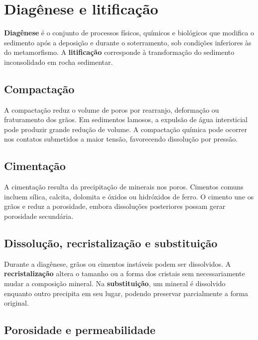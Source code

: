 \section{Diagênese e litificação}

\begin{definicao}
\textbf{Diagênese} é o conjunto de processos físicos, químicos e biológicos que modifica o sedimento após a deposição e durante o soterramento, sob condições inferiores às do metamorfismo. A \textbf{litificação} corresponde à transformação do sedimento inconsolidado em rocha sedimentar.
\end{definicao}

\subsection{Compactação}

A compactação reduz o volume de poros por rearranjo, deformação ou fraturamento dos grãos. Em sedimentos lamosos, a expulsão de água intersticial pode produzir grande redução de volume. A compactação química pode ocorrer nos contatos submetidos a maior tensão, favorecendo dissolução por pressão.

\subsection{Cimentação}

A cimentação resulta da precipitação de minerais nos poros. Cimentos comuns incluem sílica, calcita, dolomita e óxidos ou hidróxidos de ferro. O cimento une os grãos e reduz a porosidade, embora dissoluções posteriores possam gerar porosidade secundária.

\subsection{Dissolução, recristalização e substituição}

Durante a diagênese, grãos ou cimentos instáveis podem ser dissolvidos. A \textbf{recristalização} altera o tamanho ou a forma dos cristais sem necessariamente mudar a composição mineral. Na \textbf{substituição}, um mineral é dissolvido enquanto outro precipita em seu lugar, podendo preservar parcialmente a forma original.

\subsection{Porosidade e permeabilidade}

